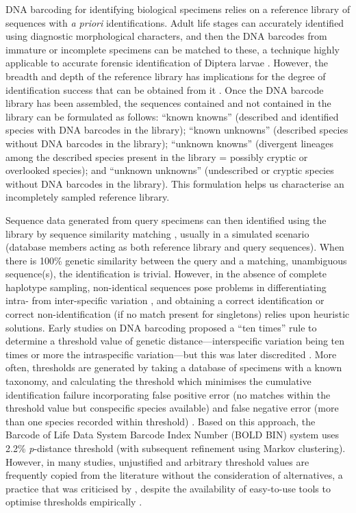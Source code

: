 \documentclass[12pt]{article}
\begin{document}
DNA barcoding for identifying biological specimens relies on a reference library of sequences with \emph{a priori} identifications. Adult life stages can accurately identified using diagnostic morphological characters, and then the DNA barcodes from immature or incomplete specimens can be matched to these, a technique highly applicable to accurate forensic identification of Diptera larvae \citep{Meiklejohn2011}. However, the breadth and depth of the reference library has implications for the degree of identification success that can be obtained from it \citep{Bergsten2012,Virgilio2012,Zhang2012b}. Once the DNA barcode library has been assembled, the sequences contained and not contained in the library can be formulated as follows: ``known knowns'' (described and identified species with DNA barcodes in the library); ``known unknowns'' (described species without DNA barcodes in the library); ``unknown knowns'' (divergent lineages among the described species present in the library = possibly cryptic or overlooked species); and ``unknown unknowns'' (undescribed or cryptic species without DNA barcodes in the library). This formulation helps us characterise an incompletely sampled reference library.

Sequence data generated from query specimens can then identified using the library by sequence similarity matching \citep{Meier2006}, usually in a simulated scenario (database members acting as both reference library and query sequences). When there is 100\% genetic similarity between the query and a matching, unambiguous sequence(s), the identification is trivial. However, in the absence of complete haplotype sampling, non-identical sequences pose problems in differentiating intra- from inter-specific variation \citep{Virgilio2012}, and obtaining a correct identification or correct non-identification (if no match present for singletons) relies upon heuristic solutions. Early studies on DNA barcoding \citep[e.g.][]{Hebert2004} proposed a ``ten times'' rule to determine a threshold value of genetic distance---interspecific variation being ten times or more the intraspecific variation---but this was later discredited \citep{Hickerson2006}. More often, thresholds are generated by taking a database of specimens with a known taxonomy, and calculating the threshold which minimises the cumulative identification failure incorporating false positive error (no matches within the threshold value but conspecific species available) and false negative error (more than one species recorded within threshold) \citep{Meyer2005}. Based on this approach, the Barcode of Life Data System Barcode Index Number (BOLD BIN) system \citep{Ratnasingham2013} uses 2.2\% \emph{p}-distance threshold (with subsequent refinement using Markov clustering). However, in many studies, unjustified and arbitrary threshold values are frequently copied from the literature without the consideration of alternatives, a practice that was criticised by \citet{Collins2013}, despite the availability of easy-to-use tools to optimise thresholds empirically \citep{Brown2012,Puillandre2012,Virgilio2012,Sonet2013}.
\end{document}
